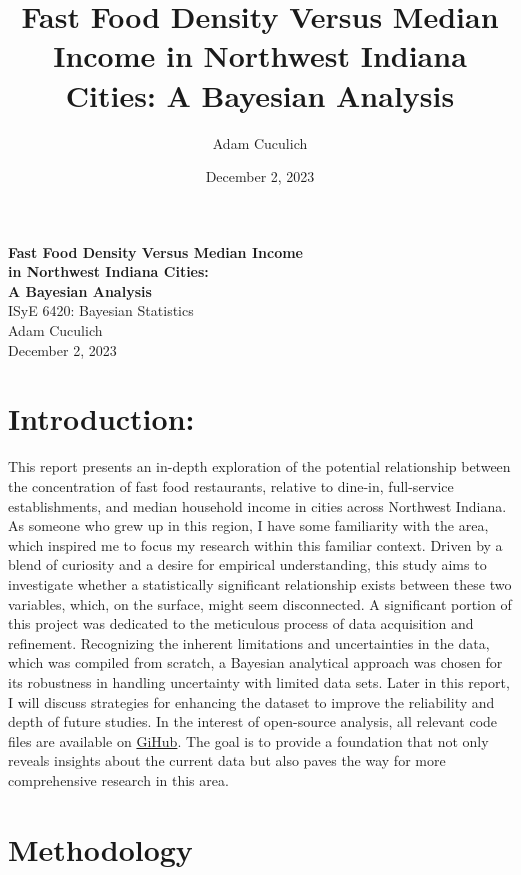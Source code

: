 \documentclass[12pt]{article}
\title{Fast Food Density Versus Median Income in Northwest Indiana Cities: A Bayesian Analysis}
\author{Adam Cuculich}
\date{December 2, 2023}
\begin{document}
\begin{titlepage}
\centering
\vspace*{\fill} %
\textbf{\Large Fast Food Density Versus Median Income\\
in Northwest Indiana Cities:\\[0.5em]
A Bayesian Analysis}\\[2em] %
\large ISyE 6420: Bayesian Statistics\\[0.5em] %
\large Adam Cuculich\\[0.5em] %
\large December 2, 2023 %
\vspace*{\fill} %
\end{titlepage}


\newpage

\section*{Introduction:}
\noindent This report presents an in-depth exploration of the potential relationship between the concentration of fast food restaurants, relative to dine-in, full-service establishments, and median household income in cities across Northwest Indiana. As someone who grew up in this region, I have some familiarity with the area, which inspired me to focus my research within this familiar context. Driven by a blend of curiosity and a desire for empirical understanding, this study aims to investigate whether a statistically significant relationship exists between these two variables, which, on the surface, might seem disconnected. A significant portion of this project was dedicated to the meticulous process of data acquisition and refinement. Recognizing the inherent limitations and uncertainties in the data, which was compiled from scratch, a Bayesian analytical approach was chosen for its robustness in handling uncertainty with limited data sets. Later in this report, I will discuss strategies for enhancing the dataset to improve the reliability and depth of future studies. In the interest of open-source analysis, all relevant code files are available on \href{https://github.com/cucupac/bayesian-stats/tree/main/project}{GiHub}. The goal is to provide a foundation that not only reveals insights about the current data but also paves the way for more comprehensive research in this area.

\section*{Methodology}
\end{document}
